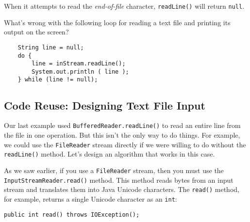 \noindent When it attempts to read the {\it end-of-file}
character, {\tt readLine()} will return {\tt null}.



\begin{SSTUDY}

\item  What's wrong with the following loop for reading
a text file and printing its output on the screen?

\begin{jjjlisting}
\begin{lstlisting}
    String line = null;
    do {
        line = inStream.readLine();
        System.out.println ( line );
    } while (line != null);
\end{lstlisting}
\end{jjjlisting}
\end{SSTUDY}

\subsection{Code Reuse: Designing Text File Input}
\noindent Our last example used {\tt BufferedReader.readLine()} to read an entire
line from the file in one operation.  But this isn't the only way
to do things.  For example, we could use the {\tt FileReader}
stream directly if we were willing to do without the {\tt readLine()}
method.  Let's design an algorithm that works in this case.

As we saw earlier, if you use a {\tt FileReader} stream, then you must
use the {\tt InputStreamReader.read()} method.  This method reads bytes
from an input stream and translates them into Java Unicode characters.
The {\tt read()} method, for example, returns a single Unicode character
as an {\tt int}:

\begin{jjjlisting}
\begin{lstlisting}
public int read() throws IOException();
\end{lstlisting}
\end{jjjlisting}

